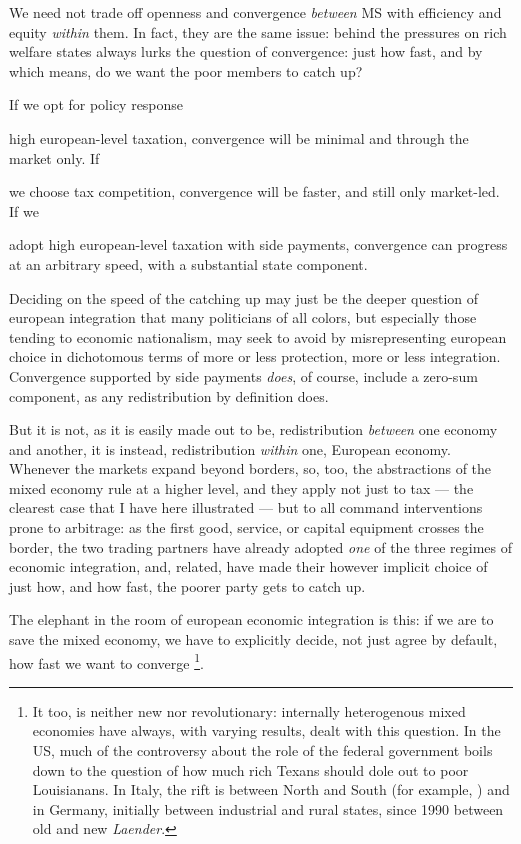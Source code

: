 
We need not trade off openness and convergence \emph{between} \gls{MS} with efficiency and equity \emph{within} them. In fact, they are the same issue: behind the pressures on rich welfare states always lurks the question of convergence: just how fast, and by which means, do we want the poor members to catch up?

If we opt for policy response \begin{inparaenum} 
	\item high european-level taxation, convergence will be minimal and through the market only. If \item we choose tax competition, convergence will be faster, and still only market-led. If we \item adopt high european-level taxation with side payments, convergence can progress at an arbitrary speed, with a substantial state component. \end{inparaenum}

Deciding on the speed of the catching up may just be the deeper question of european integration that many politicians of all colors, but especially those tending to economic nationalism, may seek to avoid by misrepresenting european choice in dichotomous terms of more or less protection, more or less integration. Convergence supported by side payments \emph{does}, of course, include a zero-sum component, as any redistribution by definition does. 

But it is not, as it is easily made out to be, redistribution \emph{between} one economy and another, it is instead, redistribution \emph{within} one, European economy. Whenever the markets expand beyond borders, so, too, the abstractions of the mixed economy rule at a higher level, and they apply not just to tax --- the clearest case that I have here illustrated --- but to all command interventions prone to arbitrage: as the first good, service, or capital equipment crosses the border, the two trading partners have already adopted \emph{one} of the three regimes of economic integration, and, related, have made their however implicit choice of just how, and how fast, the poorer party gets to catch up.

The elephant in the room of european economic integration is this: if we are to save the mixed economy, we have to explicitly decide, not just agree by default, how fast we want to converge \footnote{
	It too, is neither new nor revolutionary: internally heterogenous mixed economies have always, with varying results, dealt with this question. In the US, much of the controversy about the role of the federal government boils down to the question of how much rich Texans should dole out to poor Louisianans. In Italy, the rift is between North and South (for example, \citealt{PutnamLeonardi-1993-aa}) and in Germany, initially between industrial and rural states, since 1990 between old and new \emph{Laender}.}.

